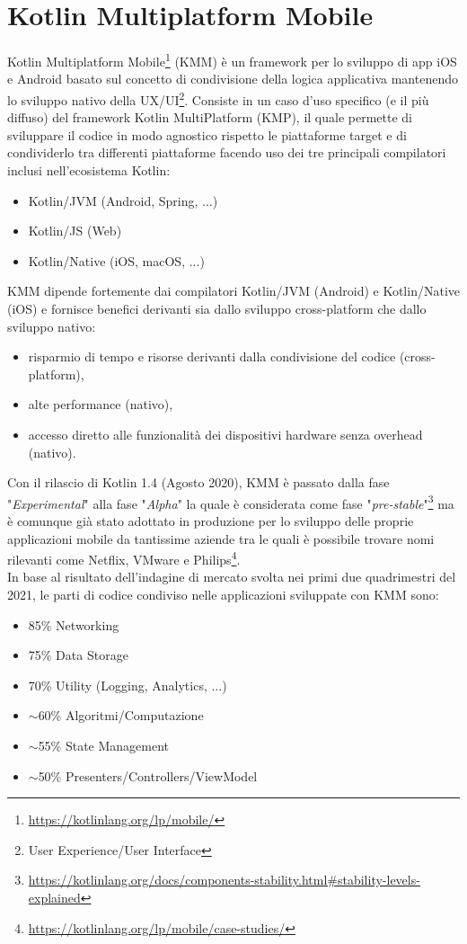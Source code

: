 
\section{Kotlin Multiplatform Mobile}
\parindent=0pt
Kotlin Multiplatform Mobile\footnote{\url{https://kotlinlang.org/lp/mobile/}} (KMM) è un framework per lo sviluppo di app iOS e Android basato sul concetto di condivisione della logica applicativa mantenendo lo sviluppo nativo della UX/UI\footnote{User Experience/User Interface}. Consiste in un caso d'uso specifico (e il più diffuso) del framework Kotlin MultiPlatform (KMP), il quale permette di sviluppare il codice in modo agnostico rispetto le piattaforme target e di condividerlo tra differenti piattaforme facendo uso dei tre principali compilatori inclusi nell'ecosistema Kotlin\cite{nagy2022simplifying}:
\begin{itemize}
    \item Kotlin/JVM (Android, Spring, ...)
    \item Kotlin/JS (Web)
    \item Kotlin/Native (iOS, macOS, ...)
\end{itemize}
KMM dipende fortemente dai compilatori Kotlin/JVM (Android) e Kotlin/Native (iOS) e fornisce benefici derivanti sia dallo sviluppo cross-platform che dallo sviluppo nativo:
\begin{itemize}
    \item risparmio di tempo e risorse derivanti dalla condivisione del codice (cross-platform),
    \item alte performance (nativo),
    \item accesso diretto alle funzionalità dei dispositivi hardware senza overhead (nativo).
\end{itemize}
Con il rilascio di Kotlin 1.4 (Agosto 2020), KMM è passato dalla fase "\textit{Experimental}" alla fase "\textit{Alpha}" la quale è considerata come fase "\textit{pre-stable}"\footnote{\url{https://kotlinlang.org/docs/components-stability.html\#stability-levels-explained}} ma è comunque già stato adottato in produzione per lo sviluppo delle proprie applicazioni mobile da tantissime aziende tra le quali è possibile trovare nomi rilevanti come Netflix, VMware e Philips\footnote{\url{https://kotlinlang.org/lp/mobile/case-studies/}}.\\
In base al risultato dell'indagine di mercato svolta nei primi due quadrimestri del 2021\cite{kmm2}, le parti di codice condiviso nelle applicazioni sviluppate con KMM sono:
\begin{itemize}
    \item 85\% Networking
    \item 75\% Data Storage
    \item 70\% Utility (Logging, Analytics, ...)
    \item $\sim$60\% Algoritmi/Computazione
    \item $\sim$55\% State Management
    \item $\sim$50\% Presenters/Controllers/ViewModel
\end{itemize}

